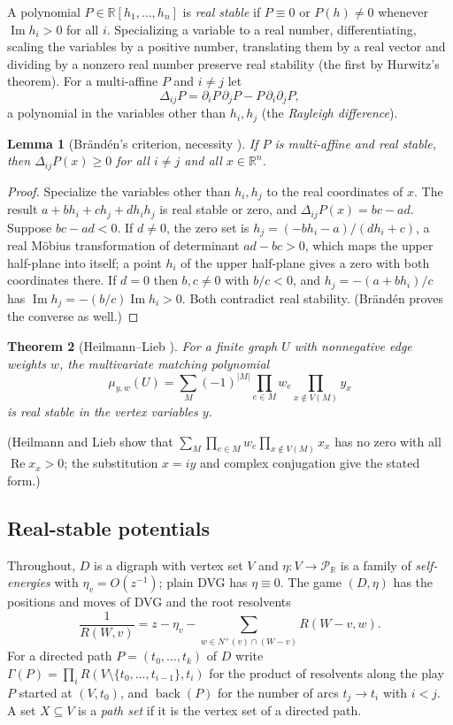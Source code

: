 \documentclass[11pt]{amsart}
\theoremstyle{plain}
\newtheorem{theorem}{Theorem}[section]
\newtheorem{lemma}[theorem]{Lemma}
\theoremstyle{definition}
\theoremstyle{remark}
\numberwithin{equation}{section}
\newcommand{\RR}{\mathbb{R}}
\newcommand{\Puis}{\mathcal{P}_{\RR}}
\newcommand{\back}{\operatorname{back}}
\renewcommand{\Im}{\operatorname{Im}}
\newcommand{\nplus}{N^{+}}
\begin{document}
A polynomial $P\in\RR[h_1,\dots,h_n]$ is \emph{real stable} if $P\equiv0$ or $P(h)\neq0$ whenever $\Im h_i>0$ for all $i$. Specializing a variable to a real number, differentiating, scaling the variables by a positive number, translating them by a real vector and dividing by a nonzero real number preserve real stability (the first by Hurwitz's theorem). For a multi-affine $P$ and $i\ne j$ let
\[
\Delta_{ij}P=\partial_iP\,\partial_jP-P\,\partial_i\partial_jP,
\]
a polynomial in the variables other than $h_i,h_j$ (the \emph{Rayleigh difference}).

\begin{lemma}[Br\"and\'en's criterion, necessity \cite{Branden}]\label{lem:branden}
If $P$ is multi-affine and real stable, then $\Delta_{ij}P(x)\ge0$ for all $i\ne j$ and all $x\in\RR^n$.
\end{lemma}
\begin{proof}
Specialize the variables other than $h_i,h_j$ to the real coordinates of $x$. The result $a+bh_i+ch_j+dh_ih_j$ is real stable or zero, and $\Delta_{ij}P(x)=bc-ad$. Suppose $bc-ad<0$. If $d\neq0$, the zero set is $h_j=(-bh_i-a)/(dh_i+c)$, a real M\"obius transformation of determinant $ad-bc>0$, which maps the upper half-plane into itself; a point $h_i$ of the upper half-plane gives a zero with both coordinates there. If $d=0$ then $b,c\ne0$ with $b/c<0$, and $h_j=-(a+bh_i)/c$ has $\Im h_j=-(b/c)\Im h_i>0$. Both contradict real stability. (Br\"and\'en proves the converse as well.)
\end{proof}

\begin{theorem}[Heilmann--Lieb \cite{HeilmannLieb}]\label{thm:hl}
For a finite graph $U$ with nonnegative edge weights $w$, the multivariate matching polynomial
\[
\mu_{y,w}(U)=\sum_M(-1)^{|M|}\prod_{e\in M}w_e\prod_{x\notin V(M)}y_x
\]
is real stable in the vertex variables $y$.
\end{theorem}
\noindent(Heilmann and Lieb show that $\sum_M\prod_{e\in M}w_e\prod_{x\notin V(M)}x_x$ has no zero with all $\operatorname{Re}x_x>0$; the substitution $x=iy$ and complex conjugation give the stated form.)

\subsection{Real-stable potentials}
Throughout, $D$ is a digraph with vertex set $V$ and $\eta\colon V\to\Puis$ is a family of \emph{self-energies} with $\eta_v=O(z^{-1})$; plain DVG has $\eta\equiv0$. The game $(D,\eta)$ has the positions and moves of DVG and the root resolvents
\[
\frac1{R(W,v)}=z-\eta_v-\sum_{w\in\nplus(v)\cap(W-v)}R(W-v,w).
\]
For a directed path $P=(t_0,\dots,t_k)$ of $D$ write $\Gamma(P)=\prod_{i}R(V\setminus\{t_0,\dots,t_{i-1}\},t_i)$ for the product of resolvents along the play $P$ started at $(V,t_0)$, and $\back(P)$ for the number of arcs $t_j\to t_i$ with $i<j$. A set $X\subseteq V$ is a \emph{path set} if it is the vertex set of a directed path.
\end{document}

